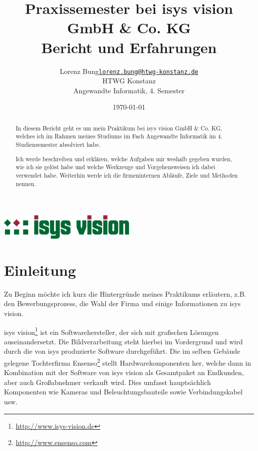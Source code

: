 \documentclass[xcolor=dvipsnames,11pt,paper=a4paper]{report}
\title{
	\Huge\textbf{Praxissemester bei isys vision GmbH \& Co. KG}\\\vspace{20pt}
	\huge{Bericht und Erfahrungen}
}
\author{
	\begin{tabular}{l l}
	Lorenz Bung &
	\href{mailto:lorenz.bung@htwg-konstanz.de}{\texttt{lorenz.bung@htwg-konstanz.de}}\\
	&HTWG Konstanz\\
	&Angewandte Informatik, 4. Semester
	\end{tabular}
}
\date{\today}
\begin{document}

\begin{titlepage}
\raggedright\includegraphics[width=0.5\textwidth]{media/isys.png}
{\let\newpage\relax\maketitle}
\end{titlepage}

\begin{abstract}
In diesem Bericht geht es um mein Praktikum bei isys vision GmbH \& Co. KG, welches
ich im Rahmen meines Studiums im Fach Angewandte Informatik im 4. Studiensemester
absolviert habe.

Ich werde beschreiben und erklären, welche Aufgaben mir weshalb gegeben wurden,
wie ich sie gelöst habe und welche Werkzeuge und Vorgehensweisen ich dabei verwendet
habe. Weiterhin werde ich die firmeninternen Abläufe, Ziele und Methoden nennen.
\end{abstract}

\tableofcontents
\pagebreak

\begingroup
\let\clearpage\relax
\lstlistoflistings
\listoffigures
\listoftables
\endgroup
\pagebreak

\setcounter{chapter}{-1}
\chapter{Einleitung}
\label{ch:0}

Zu Beginn möchte ich kurz die Hintergründe meines Praktikums erläutern,
z.B. den Bewerbungsprozess, die Wahl der Firma und einige Informationen zu isys
vision.

isys vision\footnote{\url{http://www.isys-vision.de}} ist ein Softwarehersteller, der sich mit grafischen Lösungen auseinandersetzt.
Die Bildverarbeitung steht hierbei im Vordergrund und wird durch die von isys produzierte
Software durchgeführt. Die im selben Gebäude gelegene Tochterfirma Ensenso\footnote{\url{http://www.ensenso.com}} stellt
Hardwarekomponenten her, welche dann in Kombination mit der Software von isys vision
als Gesamtpaket an Endkunden, aber auch Großabnehmer verkauft wird. Dies umfasst
hauptsächlich Komponenten wie Kameras und Beleuchtungsbauteile sowie Verbindungskabel
usw.
\end{document}
